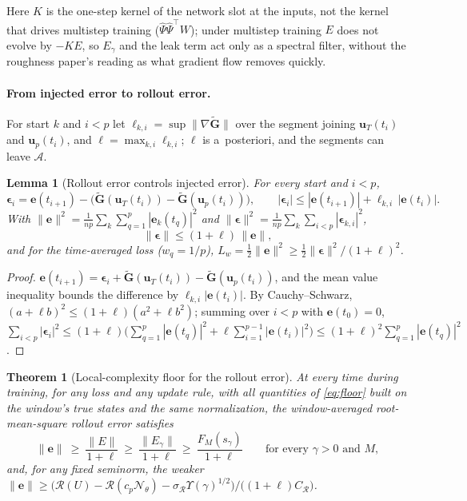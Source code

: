 \documentclass[11pt]{article}
\newtheorem{theorem}{Theorem}
\newtheorem{lemma}{Lemma}
\theoremstyle{definition}
\theoremstyle{remark}
\newcommand{\uu}{\mathbf{u}}
\newcommand{\ee}{\mathbf{e}}
\newcommand{\Gt}{\tilde{\mathbf{G}}}
\newcommand{\eps}{\bm{\epsilon}}
\newcommand{\Rgh}{\mathcal{R}}
\newcommand{\Psih}{\hat\Psi}
\newcommand{\Nn}{\mathcal N_\theta}
\begin{document}
Here $K$ is the one-step kernel of the network slot at the inputs, not the kernel that drives multistep training ($\Psih\Psih^\top W$); under multistep training $E$ does not evolve by $-KE$, so $E_\gamma$ and the leak term act only as a spectral filter, without the roughness paper's reading as what gradient flow removes quickly.

\paragraph{From injected error to rollout error.}
For start $k$ and $i<p$ let $\ell_{k,i}=\sup\|\nabla\Gt\|$ over the segment joining $\uu_T(t_i)$ and $\uu_p(t_i)$, and $\ell=\max_{k,i}\ell_{k,i}$; $\ell$ is a~posteriori, and the segments can leave $\mathcal A$.

\begin{lemma}[Rollout error controls injected error]\label{lem:inverse}
For every start and $i<p$,
\[
\eps_i=\ee(t_{i+1})-\big(\Gt(\uu_T(t_i))-\Gt(\uu_p(t_i))\big),\qquad |\eps_i|\le|\ee(t_{i+1})|+\ell_{k,i}\,|\ee(t_i)| .
\]
With $\|\ee\|^2=\frac1{np}\sum_k\sum_{q=1}^p|\ee_k(t_q)|^2$ and $\|\eps\|^2=\frac1{np}\sum_k\sum_{i<p}|\eps_{k,i}|^2$,
\begin{equation}\label{eq:inverse}
\|\eps\|\le(1+\ell)\,\|\ee\| ,
\end{equation}
and for the time-averaged loss ($w_q=1/p$), $L_w=\tfrac12\|\ee\|^2\ge\tfrac12\|\eps\|^2/(1+\ell)^2$.
\end{lemma}

\begin{proof}
$\ee(t_{i+1})=\eps_i+\Gt(\uu_T(t_i))-\Gt(\uu_p(t_i))$, and the mean value inequality bounds the difference by $\ell_{k,i}|\ee(t_i)|$.
By Cauchy--Schwarz, $(a+\ell b)^2\le(1+\ell)(a^2+\ell b^2)$; summing over $i<p$ with $\ee(t_0)=0$, $\sum_{i<p}|\eps_i|^2\le(1+\ell)\big(\sum_{q=1}^p|\ee(t_q)|^2+\ell\sum_{i=1}^{p-1}|\ee(t_i)|^2\big)\le(1+\ell)^2\sum_{q=1}^p|\ee(t_q)|^2$.
\end{proof}

\begin{theorem}[Local-complexity floor for the rollout error]\label{thm:rolloutfloor}
At every time during training, for any loss and any update rule, with all quantities of \eqref{eq:floor} built on the window's true states and the same normalization, the window-averaged root-mean-square rollout error satisfies
\begin{equation}\label{eq:rolloutfloor}
\|\ee\|\ \ge\ \frac{\|E\|}{1+\ell}\ \ge\ \frac{\|E_\gamma\|}{1+\ell}\ \ge\ \frac{F_M(s_\gamma)}{1+\ell}\qquad\text{for every }\gamma>0\text{ and }M,
\end{equation}
and, for any fixed seminorm, the weaker $\|\ee\|\ge\big(\Rgh(U)-\Rgh(c_p\Nn)-\sigma_\Rgh\Upsilon(\gamma)^{1/2}\big)/\big((1+\ell)C_\Rgh\big)$.
\end{theorem}
\end{document}
